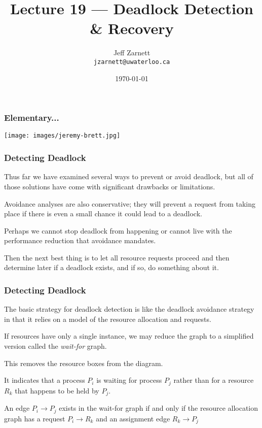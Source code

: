 

\title{Lecture 19 --- Deadlock Detection \& Recovery }

\author{Jeff Zarnett \\ \small \texttt{jzarnett@uwaterloo.ca}}
\date{\today}




\begin{frame}
	\titlepage

\end{frame}


\begin{frame}
	\frametitle{Elementary...}

	\begin{center}
		\texttt{[image: images/jeremy-brett.jpg]}
	\end{center}

\end{frame}


\begin{frame}
	\frametitle{Detecting Deadlock}

	Thus far we have examined several ways to prevent or avoid deadlock, but all of those solutions have come with significant drawbacks or limitations.

	Avoidance analyses are also conservative; they will prevent a request from taking place if there is even a small chance it could lead to a deadlock.

	Perhaps we cannot stop deadlock from happening or cannot live with the performance reduction that avoidance mandates.

	Then the next best thing is to let all resource requests proceed and then determine later if a deadlock exists, and if so, do something about it.

\end{frame}


\begin{frame}
	\frametitle{Detecting Deadlock}

	The basic strategy for deadlock detection is like the deadlock avoidance strategy in that it relies on a model of the resource allocation and requests.

	If resources have only a single instance, we may reduce the graph to a simplified version called the \textit{wait-for} graph.

	This removes the resource boxes from the diagram.

	It indicates that a process $P_{i}$ is waiting for process $P_{j}$ rather than for a resource $R_{k}$ that happens to be held by $P_{j}$.

	An edge $P_{i} \rightarrow P_{j}$ exists in the wait-for graph if and only if the resource allocation graph has a request $P_{i} \rightarrow R_{k}$ and an assignment edge $R_{k} \rightarrow P_{j}$

\end{frame}

